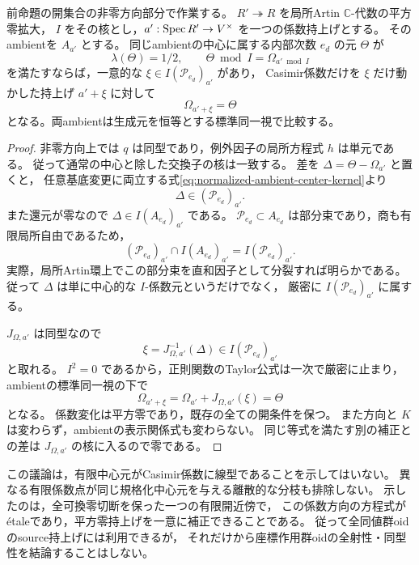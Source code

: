 \begin{lemma}[小拡大上の規格化中心差の一意な補正]
\label{lem:casimir-center-small-extension-correction}
前命題の開集合の非零方向部分で作業する。
$R'\twoheadrightarrow R$ を局所Artin $\mathbb C$-代数の平方零拡大，
$I$ をその核とし，$a':\operatorname{Spec} R'\to V^\times$ を一つの係数持上げとする。
そのambientを $A_{a'}$ とする。
同じambientの中心に属する内部次数 $e_d$ の元 $\Theta$ が
\[
          \lambda(\Theta)=1/2,
          \qquad \Theta\bmod I=\Omega_{a'\bmod I}
\]
を満たすならば，一意的な $\xi\in I(\mathcal P_{e_d})_{a'}$ があり，
Casimir係数だけを $\xi$ だけ動かした持上げ $a'+\xi$ に対して
\[
                    \Omega_{a'+\xi}=\Theta
\]
となる。両ambientは生成元を恒等とする標準同一視で比較する。
\end{lemma}
\begin{proof}
非零方向上では $q$ は同型であり，例外因子の局所方程式 $h$ は単元である。
従って通常の中心と除した交換子の核は一致する。
差を $\Delta=\Theta-\Omega_{a'}$ と置くと，
任意基底変更に両立する式\eqref{eq:normalized-ambient-center-kernel}より
\[
          \Delta\in(\mathcal P_{e_d})_{a'}.
\]
また還元が零なので $\Delta\in I(A_{e_d})_{a'}$ である。
$\mathcal P_{e_d}\subset A_{e_d}$ は部分束であり，商も有限局所自由であるため，
\[
 (\mathcal P_{e_d})_{a'}\cap I(A_{e_d})_{a'}
             =I(\mathcal P_{e_d})_{a'}.
\]
実際，局所Artin環上でこの部分束を直和因子として分裂すれば明らかである。
従って $\Delta$ は単に中心的な $I$-係数元というだけでなく，
厳密に $I(\mathcal P_{e_d})_{a'}$ に属する。

$J_{\Omega,a'}$ は同型なので
\[
               \xi=J_{\Omega,a'}^{-1}(\Delta)
                   \in I(\mathcal P_{e_d})_{a'}
\]
と取れる。
$I^2=0$ であるから，正則関数のTaylor公式は一次で厳密に止まり，
ambientの標準同一視の下で
\[
       \Omega_{a'+\xi}
          =\Omega_{a'}+J_{\Omega,a'}(\xi)
          =\Theta
\]
となる。
係数変化は平方零であり，既存の全ての開条件を保つ。
また方向と $K$ は変わらず，ambientの表示関係式も変わらない。
同じ等式を満たす別の補正との差は $J_{\Omega,a'}$ の核に入るので零である。
\end{proof}

\begin{remark}[この補正が与える範囲]
この議論は，有限中心元がCasimir係数に線型であることを示してはいない。
異なる有限係数点が同じ規格化中心元を与える離散的な分枝も排除しない。
示したのは，全可換零切断を保った一つの有限開近傍で，
この係数方向の方程式が\'{e}taleであり，平方零持上げを一意に補正できることである。
従って全同値群oidのsource持上げには利用できるが，
それだけから座標作用群oidの全射性・同型性を結論することはしない。
\end{remark}

